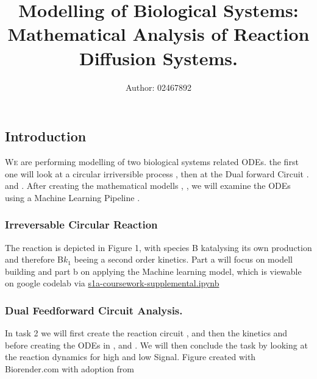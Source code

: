 \documentclass[11pt]{cls/labreport}
\title{\vspace*{2cm} Modelling of Biological Systems: Mathematical Analysis of Reaction Diffusion Systems.}
\author[1]{Author: 02467892}
\affil[1]{Mres Systems and Synthetic Biology$^{\ast}$}
\begin{document}
\maketitle
\thispagestyle{firststyle}
\vspace{-13pt}%
\begin{multicols}{2}
\part*{Introduction}
\lettrine[lines=2]{\color{color2}W}e are performing modelling of two biological systems related ODEs. the first one will look at a circular irriversible process , then at the Dual forward Circuit . and . After creating the mathematical modells , , we will examine the ODEs using a 
Machine Learning Pipeline .

\section{Irreversable Circular Reaction}
The reaction is depicted in Figure 1, with species B katalysing its own production and therefore B$k_1$ beeing a second order kinetics. Part a will focus on modell building and part b on applying the Machine learning model, which is viewable on google codelab via
\href{https://colab.research.google.com/drive/1Jj8BLVi6-IXPqv54bta5eGCVJjZAFVoR?usp=sharing}{s1a-coursework-supplemental.ipynb}
{\footnotesize{} 
\newline
\section{Dual Feedforward Circuit Analysis.}
In task 2 we will first create the reaction circuit ,  and then the kinetics  and  before creating the ODEs in ,  and . We will then conclude the task by looking at the reaction dynamics for high and low Signal.
\twocolend
{\noindent\footnotesize{} 
Figure created with Biorender.com with adoption from \cite{Storch2015} }}


\end{multicols}
\end{document}

